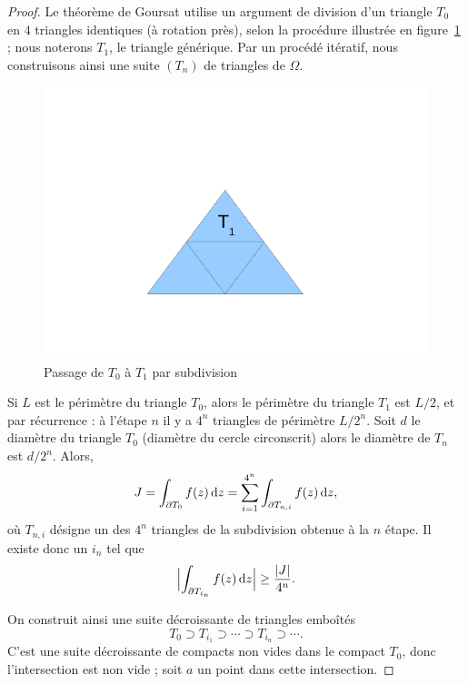 \begin{proof}
Le théorème de Goursat utilise un argument de division d'un triangle $T_0$ en $4$ triangles identiques (à rotation près), selon la procédure illustrée en figure~\ref{fig:sub_triang} ; nous noterons $T_1$, le triangle générique. Par un procédé itératif, nous construisons ainsi une suite $(T_n)$ de 
triangles de $\Omega$.

\begin{figure}[ht]
 \begin{center}
\includegraphics[scale=0.3]{images/subdivision_triangle.pdf}
\caption{Passage de $T_0$ à $T_1$ par subdivision}\label{fig:sub_triang}
\end{center}
\end{figure}

Si $L$ est le périmètre du triangle $T_0$, alors le périmètre du triangle $T_1$ est $L/2$, et par récurrence : à l'étape $n$ il y a $4^n$ triangles de périmètre $L/2^n$. Soit $d$ le diamètre du triangle $T_0$ (diamètre du cercle circonscrit) alors le diamètre de $T_n$ est $d/2^n$.
Alors,
\[J=\int_{\partial T_0} f(z) \mathop{}\mathopen{}\mathrm{d} z= \sum_{i=1}^{4^n} \int_{\partial T_{n,i}} f(z) \mathop{}\mathopen{}\mathrm{d} z,\] 
où $T_{n,i}$ désigne un des $4^n$ triangles de la subdivision obtenue à la $n$\ieme{} étape. Il existe donc un $i_n$ tel que 
\[\Bigl \lvert \int_{\partial T_{i_n}} f(z) \mathop{}\mathopen{}\mathrm{d} z \Bigr \rvert \geq \frac{\lvert J \rvert}{4^n}.\]

On construit ainsi une suite décroissante de triangles emboîtés 
\[T_0 \supset T_{i_1} \supset \cdots \supset T_{i_n} \supset \cdots.\]
C'est une suite décroissante de compacts non vides dans le compact $T_0$, donc l'intersection est non vide ; soit $a$ un point dans cette intersection. 


\end{proof}
